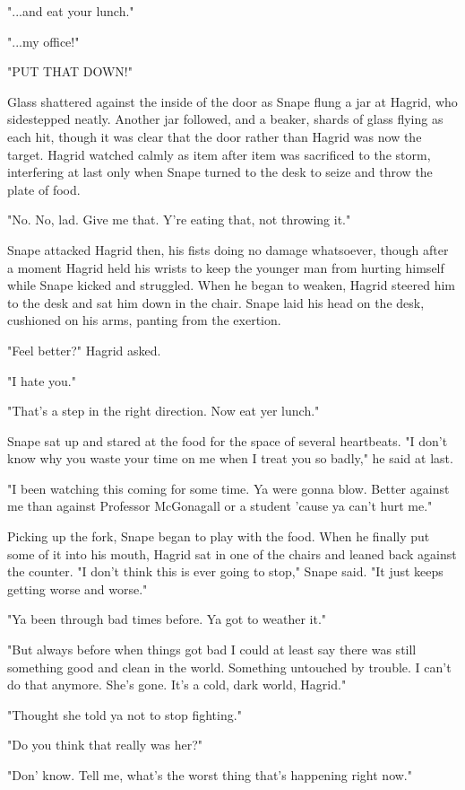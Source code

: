 "...and eat your lunch."

"...my office!"

"PUT THAT DOWN!"

Glass shattered against the inside of the door as Snape flung a jar at Hagrid, who sidestepped neatly. Another jar followed, and a beaker, shards of glass flying as each hit, though it was clear that the door rather than Hagrid was now the target. Hagrid watched calmly as item after item was sacrificed to the storm, interfering at last only when Snape turned to the desk to seize and throw the plate of food.

"No. No, lad. Give me that. Y're eating that, not throwing it."

Snape attacked Hagrid then, his fists doing no damage whatsoever, though after a moment Hagrid held his wrists to keep the younger man from hurting himself while Snape kicked and struggled. When he began to weaken, Hagrid steered him to the desk and sat him down in the chair. Snape laid his head on the desk, cushioned on his arms, panting from the exertion.

"Feel better?" Hagrid asked.

"I hate you."

"That's a step in the right direction. Now eat yer lunch."

Snape sat up and stared at the food for the space of several heartbeats. "I don't know why you waste your time on me when I treat you so badly," he said at last.

"I been watching this coming for some time. Ya were gonna blow. Better against me than against Professor McGonagall or a student 'cause ya can't hurt me."

Picking up the fork, Snape began to play with the food. When he finally put some of it into his mouth, Hagrid sat in one of the chairs and leaned back against the counter. "I don't think this is ever going to stop," Snape said. "It just keeps getting worse and worse."

"Ya been through bad times before. Ya got to weather it."

"But always before when things got bad I could at least say there was still something good and clean in the world. Something untouched by trouble. I can't do that anymore. She's gone. It's a cold, dark world, Hagrid."

"Thought she told ya not to stop fighting."

"Do you think that really was her?"

"Don' know. Tell me, what's the worst thing that's happening right now."

